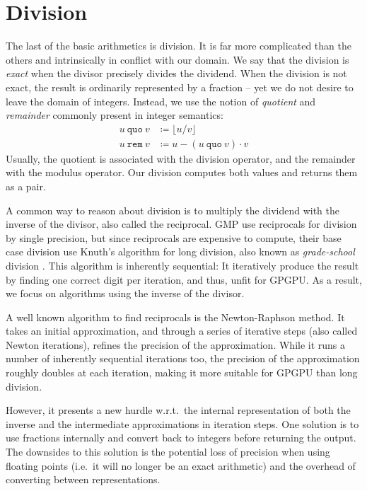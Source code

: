 \section{Division}
\label{sec:div}

The last of the basic arithmetics is division. It is far more complicated than
the others and intrinsically in conflict with our domain. We say that the
division is \textit{exact} when the divisor precisely divides the dividend. When
the division is not exact, the result is ordinarily represented by a fraction --
yet we do not desire to leave the domain of integers. Instead, we use the notion
of \textit{quotient} and \textit{remainder} commonly present in integer
semantics:
\begin{align}
  u~\mathtt{quo}~v &\coloneq \lfloor u/v \rfloor\\
  u~ \mathtt{rem}~v &\coloneq u - \left( u~\mathtt{quo}~v \right)\cdot v
\end{align}
Usually, the quotient is associated with the division operator, and the
remainder with the modulus operator. Our division computes both values and
returns them as a pair.

A common way to reason about division is to multiply the dividend with the
inverse of the divisor, also called the reciprocal. GMP use reciprocals for
division by single precision, but since reciprocals are expensive to compute,
their base case division use Knuth's algorithm for long division, also known as
\textit{grade-school} division \cite{GMP, knuth97}. This algorithm is inherently
sequential: It iteratively produce the result by finding one correct digit per
iteration, and thus, unfit for GPGPU. As a result, we focus on algorithms using
the inverse of the divisor.

A well known algorithm to find reciprocals is the Newton-Raphson method. It
takes an initial approximation, and through a series of iterative steps (also
called Newton iterations), refines the precision of the approximation. While it
runs a number of inherently sequential iterations too, the precision of the
approximation roughly doubles at each iteration, making it more suitable for
GPGPU than long division.

However, it presents a new hurdle w.r.t.\ the internal representation of both
the inverse and the intermediate approximations in iteration steps. One solution
is to use fractions internally and convert back to integers before returning the
output. The downsides to this solution is the potential loss of precision when
using floating points (i.e.\ it will no longer be an exact arithmetic) and the
overhead of converting between representations.

